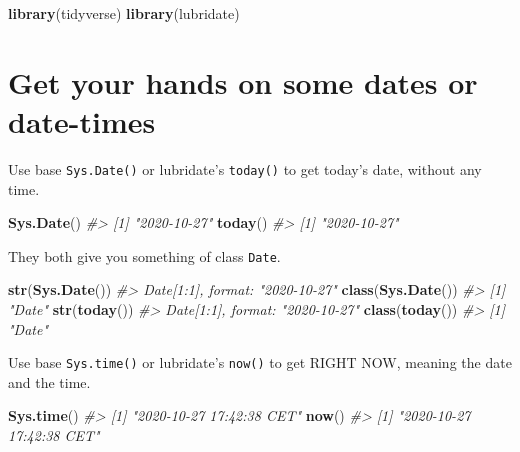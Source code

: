 \documentclass[
]{book}
\newenvironment{Shaded}{\begin{snugshade}}{\end{snugshade}}
\newcommand{\CommentTok}[1]{\textcolor[rgb]{0.56,0.35,0.01}{\textit{#1}}}
\newcommand{\KeywordTok}[1]{\textcolor[rgb]{0.13,0.29,0.53}{\textbf{#1}}}
\newcommand{\NormalTok}[1]{#1}
\begin{document}
\begin{Shaded}
\begin{Highlighting}[]
\KeywordTok{library}\NormalTok{(tidyverse)}
\KeywordTok{library}\NormalTok{(lubridate)}
\end{Highlighting}
\end{Shaded}

\hypertarget{get-your-hands-on-some-dates-or-date-times}{%
\section{Get your hands on some dates or date-times}\label{get-your-hands-on-some-dates-or-date-times}}

Use base \texttt{Sys.Date()} or lubridate's \texttt{today()} to get today's date, without any time.

\begin{Shaded}
\begin{Highlighting}[]
\KeywordTok{Sys.Date}\NormalTok{()}
\CommentTok{#> [1] "2020-10-27"}
\KeywordTok{today}\NormalTok{()}
\CommentTok{#> [1] "2020-10-27"}
\end{Highlighting}
\end{Shaded}

They both give you something of class \texttt{Date}.

\begin{Shaded}
\begin{Highlighting}[]
\KeywordTok{str}\NormalTok{(}\KeywordTok{Sys.Date}\NormalTok{())}
\CommentTok{#>  Date[1:1], format: "2020-10-27"}
\KeywordTok{class}\NormalTok{(}\KeywordTok{Sys.Date}\NormalTok{())}
\CommentTok{#> [1] "Date"}
\KeywordTok{str}\NormalTok{(}\KeywordTok{today}\NormalTok{())}
\CommentTok{#>  Date[1:1], format: "2020-10-27"}
\KeywordTok{class}\NormalTok{(}\KeywordTok{today}\NormalTok{())}
\CommentTok{#> [1] "Date"}
\end{Highlighting}
\end{Shaded}

Use base \texttt{Sys.time()} or lubridate's \texttt{now()} to get RIGHT NOW, meaning the date and the time.

\begin{Shaded}
\begin{Highlighting}[]
\KeywordTok{Sys.time}\NormalTok{()}
\CommentTok{#> [1] "2020-10-27 17:42:38 CET"}
\KeywordTok{now}\NormalTok{()}
\CommentTok{#> [1] "2020-10-27 17:42:38 CET"}
\end{Highlighting}
\end{Shaded}
\end{document}
